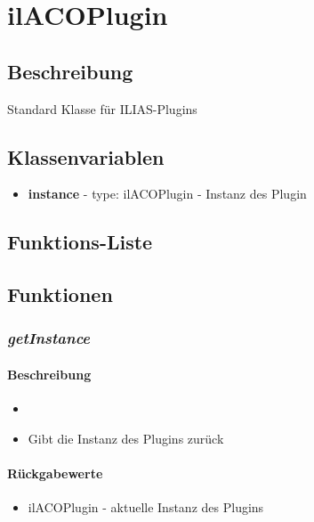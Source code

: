 \section{ilACOPlugin}

\subsection*{Beschreibung}
Standard Klasse für ILIAS-Plugins
\subsection*{Klassenvariablen}
\begin{itemize}
	\item[] \textbf{instance} - type: ilACOPlugin - Instanz des Plugin
\end{itemize}

\subsection*{Funktions-Liste}


\paragraph{}
\paragraph{}

\subsection*{Funktionen}

\subsubsection*{\textit{getInstance}}\label{getinstance}
\paragraph{Beschreibung}
\begin{itemize}
	\item[]\noindent{}
	\item[] Gibt die Instanz des Plugins zurück
\end{itemize}
\paragraph{Rückgabewerte}
\begin{itemize}
	\item[] ilACOPlugin - aktuelle Instanz des Plugins
\end{itemize}
